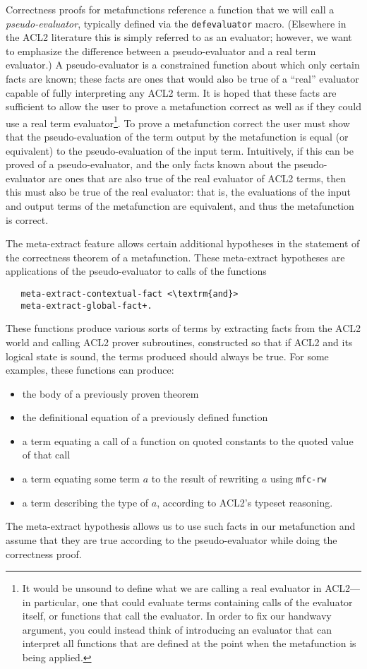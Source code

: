 Correctness proofs for metafunctions reference a
function that we will call a \textit{pseudo-evaluator}, typically
defined via the \texttt{defevaluator} macro.  (Elsewhere in the ACL2
literature this is simply referred to as an evaluator; however, we
want to emphasize the difference between a pseudo-evaluator and a real
term evaluator.)  A pseudo-evaluator is a constrained function about
which only certain facts are known; these facts are ones that would
also be true of a ``real'' evaluator capable of fully interpreting any
ACL2 term.  It is hoped that these facts are sufficient to allow the
user to prove a metafunction correct as well as if
they could use a real term evaluator\footnote{
  It would be unsound to define what we are calling a real evaluator
  in ACL2---in particular, one that could evaluate terms containing
  calls of the evaluator itself, or functions that call the evaluator.
  In order to fix our handwavy argument, you could instead think of
  introducing an evaluator that can interpret all functions that are
  defined at the point when the metafunction is being applied.
}.
To prove a metafunction correct
the user must show that the pseudo-evaluation of the term output by
the metafunction is equal (or equivalent) to the pseudo-evaluation of
the input term.  Intuitively, if this can be proved of a
pseudo-evaluator, and the only facts known about the pseudo-evaluator
are ones that are also true of the real evaluator of ACL2 terms, then
this must also be true of the real evaluator: that is, the evaluations
of the input and output terms of the metafunction are equivalent, and
thus the metafunction is correct.

The meta-extract feature allows certain additional hypotheses in the
statement of the correctness theorem of a metafunction.  These meta-extract
hypotheses are applications of the pseudo-evaluator to calls of the
functions
\begin{lstlisting}
   meta-extract-contextual-fact <\textrm{and}>
   meta-extract-global-fact+.
 \end{lstlisting}
 These functions produce various
sorts of terms by extracting facts from the ACL2 world and calling
ACL2 prover subroutines, constructed so that if ACL2 and its logical
state is sound, the terms produced should always be true.  For some
examples, these functions can produce:
\begin{itemize}
\item the body of a previously proven theorem
\item the definitional equation of a previously defined function
\item a term equating a call of a function on quoted constants to the
  quoted value of that call
\item a term equating some term $a$ to the result of rewriting $a$
  using \texttt{mfc-rw}
\item a term describing the type of $a$, according to ACL2's typeset
  reasoning.
\end{itemize}
The meta-extract hypothesis allows us to use such facts in our
metafunction and assume that they are true according to the
pseudo-evaluator while doing the correctness proof.

